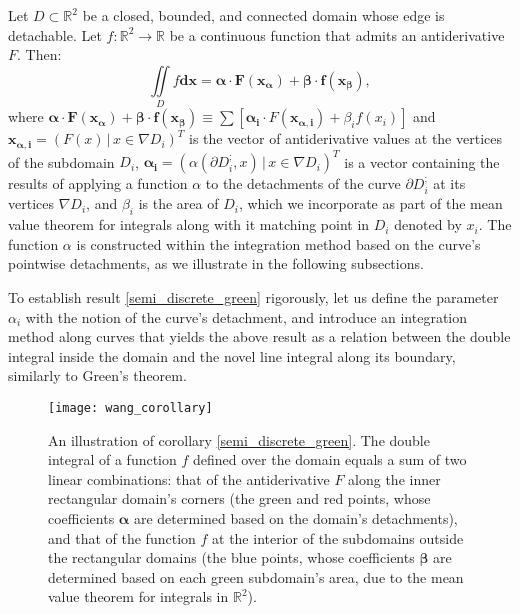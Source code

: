 \documentclass[11pt]{book}
\begin{document}
\begin{corollary}\label{semi_discrete_green}Let $D\subset\mathbb{R}^{2}$ be a closed, bounded, and connected domain whose edge is detachable. Let $f:\mathbb{R}^{2}\rightarrow\mathbb{R}$ be a continuous function that admits an antiderivative $F$. Then:
$$\underset{{\scriptscriptstyle D}}{\iint}f\boldsymbol{dx}=\boldsymbol{\alpha}\cdot\boldsymbol{F\left(x_{\alpha}\right)}+\boldsymbol{\beta}\cdot\boldsymbol{f\left(x_{\beta}\right)},$$
where $\boldsymbol{\alpha}\cdot\boldsymbol{F\left(x_{\alpha}\right)}+\boldsymbol{\beta}\cdot\boldsymbol{f\left(x_{\beta}\right)}\equiv\sum\left[\boldsymbol{\alpha_{i}}\cdot F\left(\boldsymbol{x_{\alpha,i}}\right)+\beta_{i}f\left(x_{i}\right)\right]$ and $\boldsymbol{x_{\alpha,i}}=\left(F\left(x\right)\,|\,x\in\nabla D_{i}\right)^T$ is the vector of antiderivative values at the vertices of the subdomain $D_{i}$, $\boldsymbol{\alpha_{i}}=\left(\alpha\left(\partial D_{i}^{;},x\right)\,|\,x\in\nabla D_{i}\right)^T$ is a vector containing the results of applying a function $\alpha$ to the detachments of the curve $\partial D_{i}^{;}$ at its vertices $\nabla D_{i}$, and $\beta_i$ is the area of $D_i$, which we incorporate as part of the mean value theorem for integrals along with it matching point in $D_i$ denoted by $x_i$. The function $\alpha$ is constructed within the integration method based on the curve's pointwise detachments, as we illustrate in the following subsections.
\end{corollary}

To establish result \ref{semi_discrete_green} rigorously, let us define the parameter $\alpha_i$ with the notion of the curve's detachment, and introduce an integration method along curves that yields the above result as a relation between the double integral inside the domain and the novel line integral along its boundary, similarly to Green's theorem.

\begin{figure}
\texttt{[image: wang\_corollary]}
\caption{An illustration of corollary \ref{semi_discrete_green}. The double integral of a function $f$ defined over the domain equals a sum of two linear combinations: that of the antiderivative $F$ along the inner rectangular domain's corners (the green and red points, whose coefficients $\boldsymbol{\alpha}$ are determined based on the domain's detachments), and that of the function $f$ at the interior of the subdomains outside the rectangular domains (the blue points, whose coefficients $\boldsymbol{\beta}$ are determined based on each green subdomain's area, due to the mean value theorem for integrals in $\mathbb{R}^2$).}
\label{ftc_on_grd}
\end{figure}
\end{document}
